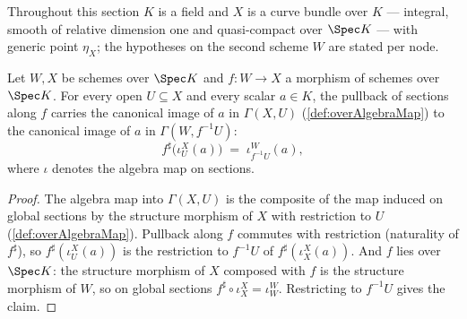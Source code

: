 Throughout this section \(K\) is a field and \(X\) is a curve bundle over \(K\) ---
integral, smooth of relative dimension one and quasi-compact over \(\Spec K\) --- with
generic point \(\eta_X\); the hypotheses on the second scheme \(W\) are stated per
node.

\begin{lemma}
  \label{lem:overAlgebraMap_app}
  \leanok
  Let \(W, X\) be schemes over \(\Spec K\) and \(f : W \to X\) a morphism of schemes
  over \(\Spec K\). For every open \(U \subseteq X\) and every scalar \(a \in K\), the
  pullback of sections along \(f\) carries the canonical image of \(a\) in
  \(\Gamma(X, U)\) (\ref{def:overAlgebraMap}) to the canonical image of \(a\) in
  \(\Gamma(W, f^{-1}U)\):
  \[
    f^{\sharp}\bigl(\iota^{X}_{U}(a)\bigr) \;=\; \iota^{W}_{f^{-1}U}(a),
  \]
  where \(\iota\) denotes the algebra map on sections.
\end{lemma}
\begin{proof}
  \leanok
  The algebra map into \(\Gamma(X, U)\) is the composite of the map induced on global
  sections by the structure morphism of \(X\) with restriction to \(U\)
  (\ref{def:overAlgebraMap}). Pullback along \(f\) commutes with restriction
  (naturality of \(f^{\sharp}\)), so \(f^{\sharp}(\iota^{X}_{U}(a))\) is the
  restriction to \(f^{-1}U\) of \(f^{\sharp}(\iota^{X}_{X}(a))\). And \(f\) lies over
  \(\Spec K\): the structure morphism of \(X\) composed with \(f\) is the structure
  morphism of \(W\), so on global sections \(f^{\sharp} \circ \iota^{X}_{X} =
  \iota^{W}_{W}\). Restricting to \(f^{-1}U\) gives the claim.
\end{proof}

